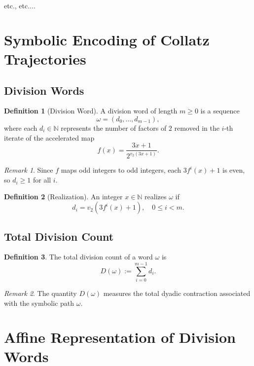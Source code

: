 \documentclass[12pt, oneside]{article}
\numberwithin{equation}{section}
\theoremstyle{definition}
\newtheorem{definition}{Definition}[section]
\theoremstyle{plain}
\theoremstyle{remark}
\newtheorem*{remark}{Remark}
\begin{document}
etc., etc....

\section{Symbolic Encoding of Collatz Trajectories}
\label{sec:division-counts}

\subsection{Division Words}

\begin{definition}[Division Word]
A division word of length $m \ge 0$ is a sequence
\[
\omega = (d_0, \dots, d_{m-1}),
\]
where each $d_i \in \mathbb{N}$ represents the number of factors of $2$
removed in the $i$-th iterate of the accelerated map
\[
f(x) = \frac{3x+1}{2^{v_2(3x+1)}}.
\]
\end{definition}

\begin{remark}
Since $f$ maps odd integers to odd integers, each $3f^i(x)+1$ is even,
so $d_i \ge 1$ for all $i$.
\end{remark}

\begin{definition}[Realization]
An integer $x \in \mathbb{N}$ realizes $\omega$ if
\[
d_i = v_2(3f^i(x)+1), \quad 0 \le i < m.
\]
\end{definition}

\subsection{Total Division Count}

\begin{definition}
The total division count of a word $\omega$ is
\[
D(\omega) := \sum_{i=0}^{m-1} d_i.
\]
\end{definition}

\begin{remark}
The quantity $D(\omega)$ measures the total dyadic contraction
associated with the symbolic path $\omega$.
\end{remark}

\section{Affine Representation of Division Words}
\end{document}

